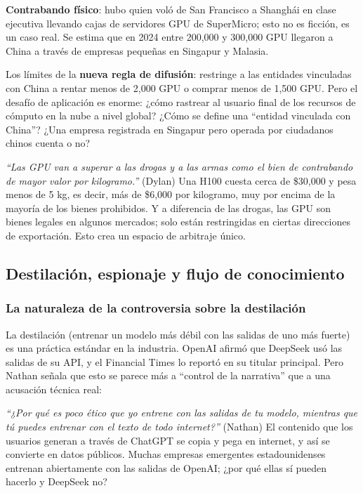 \textbf{Contrabando físico}: hubo quien voló de San Francisco a Shanghái en clase ejecutiva llevando cajas de servidores GPU de SuperMicro; esto no es ficción, es un caso real. Se estima que en 2024 entre 200,000 y 300,000 GPU llegaron a China a través de empresas pequeñas en Singapur y Malasia.

Los límites de la \textbf{nueva regla de difusión}: restringe a las entidades vinculadas con China a rentar menos de 2,000 GPU o comprar menos de 1,500 GPU. Pero el desafío de aplicación es enorme: ¿cómo rastrear al usuario final de los recursos de cómputo en la nube a nivel global? ¿Cómo se define una ``entidad vinculada con China''? ¿Una empresa registrada en Singapur pero operada por ciudadanos chinos cuenta o no?

\textit{``Las GPU van a superar a las drogas y a las armas como el bien de contrabando de mayor valor por kilogramo.''} (Dylan) Una H100 cuesta cerca de \$30,000 y pesa menos de 5 kg, es decir, más de \$6,000 por kilogramo, muy por encima de la mayoría de los bienes prohibidos. Y a diferencia de las drogas, las GPU son bienes legales en algunos mercados; solo están restringidas en ciertas direcciones de exportación. Esto crea un espacio de arbitraje único.

\subsection{Destilación, espionaje y flujo de conocimiento}

\subsubsection{La naturaleza de la controversia sobre la destilación}

La destilación (entrenar un modelo más débil con las salidas de uno más fuerte) es una práctica estándar en la industria. OpenAI afirmó que DeepSeek usó las salidas de su API, y el Financial Times lo reportó en su titular principal. Pero Nathan señala que esto se parece más a ``control de la narrativa'' que a una acusación técnica real:

\textit{``¿Por qué es poco ético que yo entrene con las salidas de tu modelo, mientras que tú puedes entrenar con el texto de todo internet?''} (Nathan) El contenido que los usuarios generan a través de ChatGPT se copia y pega en internet, y así se convierte en datos públicos. Muchas empresas emergentes estadounidenses entrenan abiertamente con las salidas de OpenAI; ¿por qué ellas sí pueden hacerlo y DeepSeek no?

